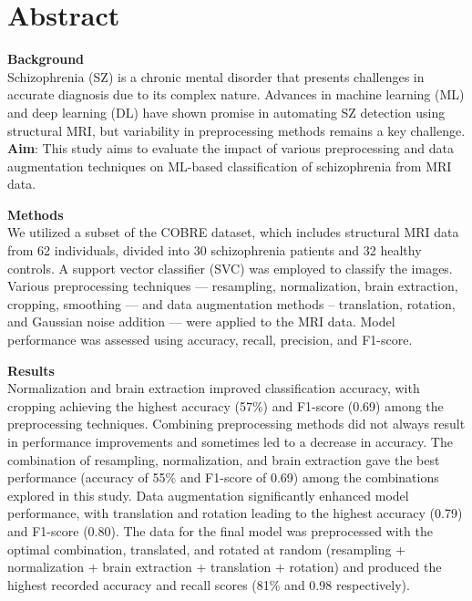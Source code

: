 



\maketitle

\section{Abstract}

\textbf{Background}\\
Schizophrenia (SZ) is a chronic mental disorder that presents challenges in accurate diagnosis due to its complex nature. Advances in machine learning (ML) and deep learning (DL) have shown promise in automating SZ detection using structural MRI, but variability in preprocessing methods remains a key challenge.
\textbf{Aim}: This study aims to evaluate the impact of various preprocessing and data augmentation techniques on ML-based classification of schizophrenia from MRI data.

\textbf{Methods}\\
We utilized a subset of the COBRE dataset, which includes structural MRI data from 62 individuals, divided into 30 schizophrenia patients and 32 healthy controls. A support vector classifier (SVC) was employed to classify the images. Various preprocessing techniques --- resampling, normalization, brain extraction, cropping, smoothing --- and data augmentation methods -- translation, rotation, and Gaussian noise addition --- were applied to the MRI data. Model performance was assessed using accuracy, recall, precision, and F1-score.

\textbf{Results}\\
Normalization and brain extraction improved classification accuracy, with cropping achieving the highest accuracy (57\%) and F1-score (0.69) among the preprocessing techniques. Combining preprocessing methods did not always result in performance improvements and sometimes led to a decrease in accuracy. The combination of resampling, normalization, and brain extraction gave the best performance (accuracy of 55\% and F1-score of 0.69) among the combinations explored in this study. Data augmentation significantly enhanced model performance, with translation and rotation leading to the highest accuracy (0.79) and F1-score (0.80). The data for the final model was preprocessed with the optimal combination, translated, and rotated at random (resampling + normalization + brain extraction + translation + rotation) and produced the highest recorded accuracy and recall scores (81\% and 0.98 respectively).

